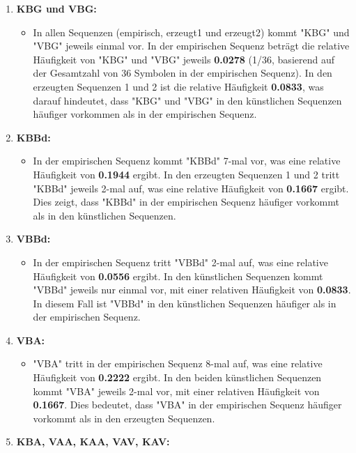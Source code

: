\documentclass[
]{article}
\begin{document}
\begin{enumerate}
\def\labelenumi{\arabic{enumi}.}
\item
  \textbf{KBG und VBG:}

  \begin{itemize}
  \item
    In allen Sequenzen (empirisch, erzeugt1 und erzeugt2) kommt "KBG"
    und "VBG" jeweils einmal vor. In der empirischen Sequenz beträgt die
    relative Häufigkeit von "KBG" und "VBG" jeweils \textbf{0.0278}
    (1/36, basierend auf der Gesamtzahl von 36 Symbolen in der
    empirischen Sequenz). In den erzeugten Sequenzen 1 und 2 ist die
    relative Häufigkeit \textbf{0.0833}, was darauf hindeutet, dass
    "KBG" und "VBG" in den künstlichen Sequenzen häufiger vorkommen als
    in der empirischen Sequenz.
  \end{itemize}
\item
  \textbf{KBBd:}

  \begin{itemize}
  \item
    In der empirischen Sequenz kommt "KBBd" 7-mal vor, was eine relative
    Häufigkeit von \textbf{0.1944} ergibt. In den erzeugten Sequenzen 1
    und 2 tritt "KBBd" jeweils 2-mal auf, was eine relative Häufigkeit
    von \textbf{0.1667} ergibt. Dies zeigt, dass "KBBd" in der
    empirischen Sequenz häufiger vorkommt als in den künstlichen
    Sequenzen.
  \end{itemize}
\item
  \textbf{VBBd:}

  \begin{itemize}
  \item
    In der empirischen Sequenz tritt "VBBd" 2-mal auf, was eine relative
    Häufigkeit von \textbf{0.0556} ergibt. In den künstlichen Sequenzen
    kommt "VBBd" jeweils nur einmal vor, mit einer relativen Häufigkeit
    von \textbf{0.0833}. In diesem Fall ist "VBBd" in den künstlichen
    Sequenzen häufiger als in der empirischen Sequenz.
  \end{itemize}
\item
  \textbf{VBA:}

  \begin{itemize}
  \item
    "VBA" tritt in der empirischen Sequenz 8-mal auf, was eine relative
    Häufigkeit von \textbf{0.2222} ergibt. In den beiden künstlichen
    Sequenzen kommt "VBA" jeweils 2-mal vor, mit einer relativen
    Häufigkeit von \textbf{0.1667}. Dies bedeutet, dass "VBA" in der
    empirischen Sequenz häufiger vorkommt als in den erzeugten
    Sequenzen.
  \end{itemize}
\item
  \textbf{KBA, VAA, KAA, VAV, KAV:}


\end{enumerate}
\end{document}
